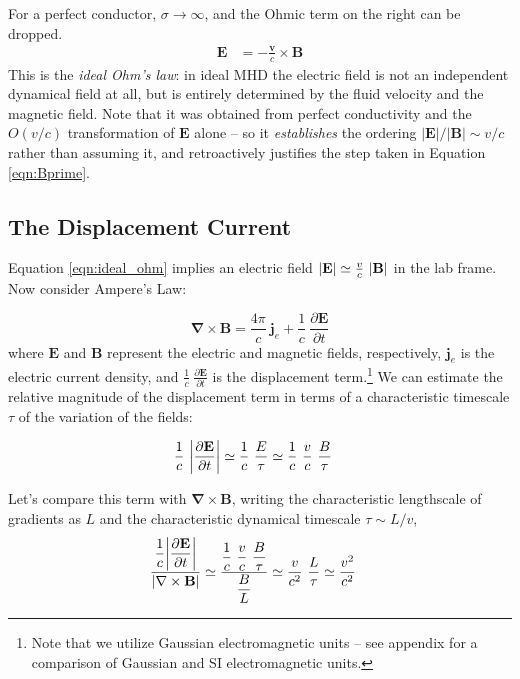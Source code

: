 \documentclass[notoc]{tufte-handout}
\renewcommand{\vec}[1]{\mathbf{#1}}
\newcommand{\del}{\vec{\nabla}}
\newcommand{\E}{\vec{E}}
\newcommand{\B}{\vec{B}}
\begin{document}
 For a perfect conductor, $\sigma\to \infty$, and the Ohmic term on the right can be dropped.
\begin{align}
    \E & = - \frac{\vec{v}}{c} \times \B
\label{eqn:ideal_ohm}
\end{align}
%
This is the {\it ideal Ohm's law}: in ideal MHD the electric field is not an independent dynamical field at all, but is entirely determined by the fluid velocity and the magnetic field. Note that it was obtained from perfect conductivity and the $O(v/c)$ transformation of $\E$ alone -- so it {\it establishes} the ordering $|\E|/|\B| \sim v/c$ rather than assuming it, and retroactively justifies the step taken in Equation \ref{eqn:Bprime}.

\subsection{The Displacement Current}

Equation \ref{eqn:ideal_ohm} implies an electric field  $\abs{\E}\simeq \frac{v}{c}\ \abs {\vec {B}}$ in the lab frame. Now consider Ampere's Law:

\begin{equation}
\del \times \B = \frac{4\pi }{c}~\vec{j}_e + \frac{1}{c}~\frac{\partial\E}{\partial t}
\end{equation}
where $\vec {E}$ and $\vec {B}$ represent the electric and magnetic fields, respectively, $\vec{j}_e$ is the electric current density, and $\frac{1}{c}~\frac{\partial\vec{E}}{\partial t}$ is the displacement term.\footnote {Note that we utilize Gaussian electromagnetic units -- see appendix for a comparison of Gaussian and SI electromagnetic units.}
%
We can estimate the relative magnitude of the displacement term in terms of a characteristic timescale $\tau$ of the variation of the fields:

\begin{align}
\frac{1}{c}~\abs{\frac{\partial \E}{\partial t}} & \simeq \frac{1}{c}~\frac{E}{\tau} \simeq \frac{1}{c}~\frac{v}{c}~\frac{B}{\tau}
\end{align}

Let's compare this term with $\del \times \B$, writing the characteristic lengthscale of gradients as $L$ and the characteristic dynamical timescale $\tau \sim L / v$,
\begin{align}
\frac{\displaystyle\frac{1}{c} \abs{\frac{\partial \E}{\partial t}} }{\abs{\del \times \B}} & \simeq \frac{\displaystyle\frac{1}{c}~\frac{v}{c}~\frac{B}{\tau}}{\displaystyle\frac{B}{L}} \simeq \frac{v}{c^2}~\frac{L}{\tau} \simeq \frac{v^2}{c^2}
\end{align}
%
\end{document}
